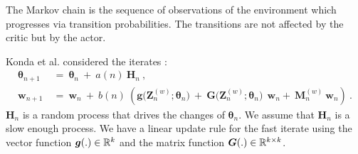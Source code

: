 \documentclass{article}
\newcommand\Bg{\bm{g}}
\newcommand\Bw{\bm{w}}
\newcommand\BG{\bm{G}}
\newcommand\BH{\bm{H}}
\newcommand\BM{\bm{M}}
\newcommand\BZ{\bm{Z}}
\newcommand\Bth{\bm{\theta}}
\begin{document}
The Markov chain is the sequence of observations of the environment
which progresses via transition probabilities.
The transitions are not affected by the critic but
by the actor.


Konda et al. considered the iterates \cite{Konda:02,Konda:03}:
\begin{align}
\label{eq:iter1Konda}
\Bth_{n+1} \ &= \ \Bth_n \ + \ a(n) \ \BH_n \ ,\\
\label{eq:iter2Konda}
\Bw_{n+1} \ &= \ \Bw_n  \ + \ b(n)\ \left(
\Bg\big(\BZ^{(w)}_n;\Bth_n\big) \ + \ \BG\big( \BZ^{(w)}_n;\Bth_n\big) \ \ \Bw_n
              + \ \BM^{(w)}_{n} \ \Bw_n \right) \ .
\end{align}
$\BH_n$ is a random process that drives the changes of
$\Bth_n$. We assume that $\BH_n$ is a slow enough process.
We have a linear update rule for the fast iterate using
the vector function $\Bg(.)\in \dR^k$ and
the matrix function $\BG(.)\in \dR^{k\times k}$.
\end{document}
